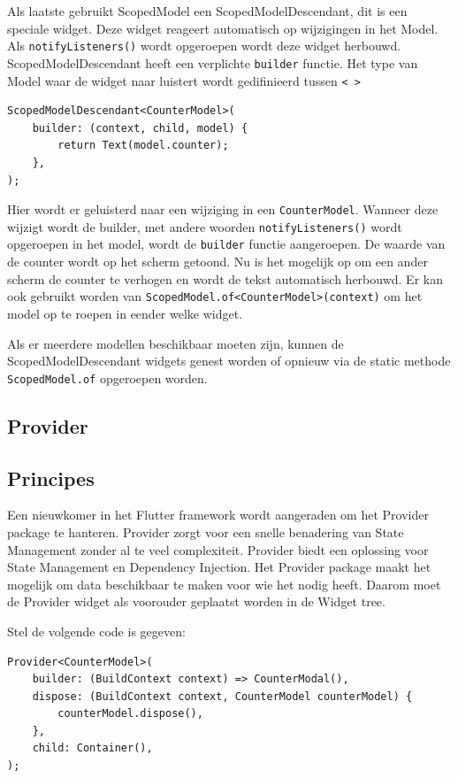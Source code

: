 Als laatste gebruikt ScopedModel een ScopedModelDescendant, dit is een speciale widget. Deze widget reageert automatisch op wijzigingen in het Model. Als \verb|notifyListeners()| wordt opgeroepen wordt deze widget herbouwd.
ScopedModelDescendant heeft een verplichte \verb|builder| functie. Het type van Model waar de widget naar luistert wordt gedifinieerd tussen \verb|< >|
\begin{verbatim}
ScopedModelDescendant<CounterModel>(
    builder: (context, child, model) {
        return Text(model.counter);
    },
);
\end{verbatim}
Hier wordt er geluisterd naar een wijziging in een \verb|CounterModel|. Wanneer deze wijzigt wordt de builder, met andere woorden \verb|notifyListeners()| wordt opgeroepen in het model, wordt de \verb|builder| functie aangeroepen. De waarde van de counter wordt op het scherm getoond. Nu is het mogelijk op om een ander scherm de counter te verhogen en wordt de tekst automatisch herbouwd. Er kan ook gebruikt worden van \verb|ScopedModel.of<CounterModel>(context)| om het model op te roepen in eender welke widget.

Als er meerdere modellen beschikbaar moeten zijn, kunnen de ScopedModelDescendant widgets genest worden of opnieuw via de static methode \verb|ScopedModel.of| opgeroepen worden.

\subsection{Provider}
\subsection*{Principes}
Een nieuwkomer in het Flutter framework wordt aangeraden om het Provider package te hanteren. Provider zorgt voor een snelle benadering van State Management zonder al te veel complexiteit. Provider biedt een oplossing voor State Management en Dependency Injection.
Het Provider package maakt het mogelijk om data beschikbaar te maken voor wie het nodig heeft. Daarom moet de Provider widget als voorouder geplaatst worden in de Widget tree.

Stel de volgende code is gegeven:
\begin{verbatim}
Provider<CounterModel>(
    builder: (BuildContext context) => CounterModal(),
    dispose: (BuildContext context, CounterModel counterModel) {
        counterModel.dispose(),
    },
    child: Container(),
);
\end{verbatim}

